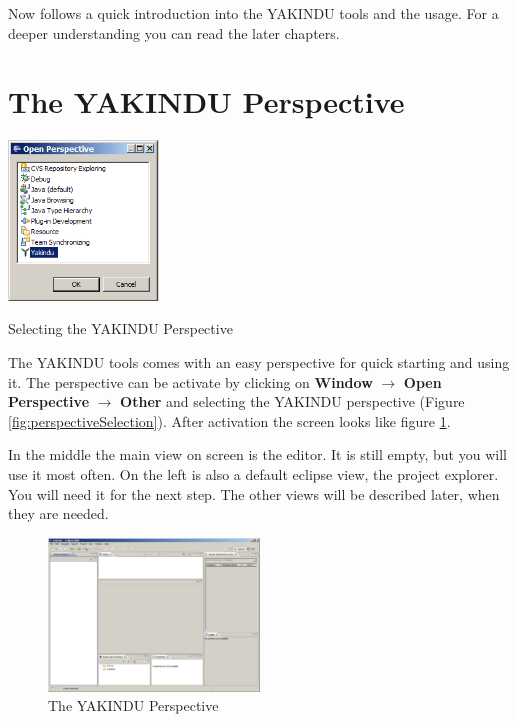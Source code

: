 %

Now follows a quick introduction into the YAKINDU tools and the usage. For a
deeper understanding you can read the later chapters.
\section{The YAKINDU Perspective}
\begin{floatingfigure}[r]{0.3\textwidth}
  \centering
\includegraphics[width=0.3\textwidth]{./Pictures/yakinduPerspectiveSelection}
\caption{\label{fig:perspectiveSelection}Selecting the YAKINDU Perspective} 
\end{floatingfigure}
The YAKINDU tools comes with an easy perspective for quick starting and using it.
The perspective can be activate by clicking on \textbf{Window} $\rightarrow$
\textbf{Open Perspective} $\rightarrow$ \textbf{Other} and selecting the YAKINDU
perspective (Figure \ref{fig:perspectiveSelection}). After activation the screen
looks like figure \ref{fig:perspective}.

In the middle the main view on screen is the editor. It is still empty, but you
will use it most often. On the left is also a default eclipse view, the project
explorer. You will need it for the next step. The other views will be described
later, when they are needed.

\begin{figure}[ht]
\includegraphics[width=0.5\textwidth]{./Pictures/perspective}
\caption{\label{fig:perspective}The YAKINDU Perspective} 
\end{figure}



